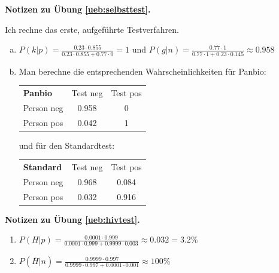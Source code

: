 \documentclass[%
11pt,%
twoside,%
titlepage,%
german,%
headsepline%
]{scrartcl}
\newcommand{\spaltenheight}{\rule{0mm}{3ex}}
\newcommand{\spaltensep}{\\[1ex]}
\newcommand{\concatueb}[1]{ueb:#1}%
\newcommand{\concatlsg}[1]{lsg:#1}%
\newenvironment{lsg}[1]{%
    \par\noindent\textbf{Notizen zu Übung \ref{\concatueb{#1}}.}%
    \label{\concatlsg{#1}}
}{%
    \par%
}
\begin{document}
\begin{lsg}{selbsttest}
Ich rechne das erste, aufgeführte Testverfahren.
    \begin{enumerate}[a)]
        \item $P(k|p)=\frac{0.23\cdot0.855}{0.23\cdot0.855+0.77\cdot0}=1$ und $P(g|n)=\frac{0.77\cdot1}{0.77\cdot1+0.23\cdot0.145}\approx0.958$

        \item Man berechne die entsprechenden Wahrscheinlichkeiten für Panbio:\\
        
        \begin{table}[h!]
\begin{center}
\begin{tabular}{|l|c|c|}
\hline
\rowcolor{Gray}\spaltenheight \textbf{Panbio} & Test neg & Test pos \spaltensep \hhline{|-|-|-|}
\rowcolor{lightyellow}\spaltenheight  Person neg & 0.958 & 0 \spaltensep \hhline{|-|-|-|}
\rowcolor{Gray}\spaltenheight  Person pos & 0.042 & 1 \spaltensep \hline
\end{tabular}
\end{center}
\end{table}

und für den Standardtest:\\
        
        \begin{table}[h!]
\begin{center}
\begin{tabular}{|l|c|c|}
\hline
\rowcolor{Gray}\spaltenheight \textbf{Standard} & Test neg & Test pos \spaltensep \hhline{|-|-|-|}
\rowcolor{lightyellow}\spaltenheight  Person neg & 0.968 & 0.084 \spaltensep \hhline{|-|-|-|}
\rowcolor{Gray}\spaltenheight  Person pos & 0.032 & 0.916 \spaltensep \hline
\end{tabular}
\end{center}
\end{table}
    \end{enumerate}
\end{lsg}
\begin{lsg}{hivtest}
\begin{enumerate}
    \item $P(H|p)=\frac{0.0001\cdot0.999}{0.0001\cdot0.999+0.9999\cdot0.003}\approx0.032=3.2\%$
    \item $P(\overline{H}|n)=\frac{0.9999\cdot0.997}{0.9999\cdot0.997+0.0001\cdot0.001}\approx100\%$
\end{enumerate}
\end{lsg}
\end{document}
